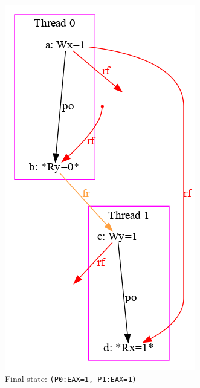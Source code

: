 \begin{figure}[!htb]
\begin{subfigure}[t]{.23\textwidth}
  \includegraphics[width=.9\linewidth]{img/my/sb-example/SB-dot-3.png}
  \caption{Final state: \texttt{(P0:EAX=1,~P1:EAX=1)}}
  \label{simple_wmm_x86_pic:sub3}
\end{subfigure}
\hfill
\begin{subfigure}[t]{.23\textwidth}
  \centering

\end{subfigure}
\end{figure}
